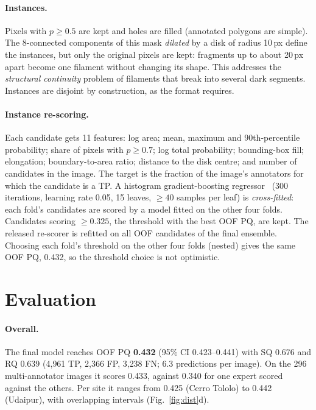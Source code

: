 \documentclass[sigconf]{acmart}
\begin{document}
\paragraph{Instances.} Pixels with $p\ge0.5$ are kept and holes are filled (annotated polygons are simple). The 8-connected
components of this mask \emph{dilated} by a disk of radius 10\,px define the instances, but only the original pixels are
kept: fragments up to about 20\,px apart become one filament without changing its shape. This addresses the
\emph{structural continuity} problem of filaments that break into several dark segments. Instances are disjoint by
construction, as the format requires.

\paragraph{Instance re-scoring.} Each candidate gets 11 features: log area; mean, maximum and 90th-percentile probability;
share of pixels with $p\ge0.7$; log total probability; bounding-box fill; elongation; boundary-to-area ratio; distance to
the disk centre; and number of candidates in the image. The target is the fraction of the image's annotators for which
the candidate is a TP. A histogram gradient-boosting regressor~\cite{pedregosa2011sklearn,ke2017lightgbm} (300 iterations,
learning rate 0.05, 15 leaves, $\ge40$ samples per leaf) is \emph{cross-fitted}: each fold's candidates are scored by a
model fitted on the other four folds. Candidates scoring $\ge0.325$, the threshold with the best OOF PQ, are kept. The
released re-scorer is refitted on all OOF candidates of the final ensemble. Choosing each fold's threshold on the other
four folds (nested) gives the same OOF PQ, 0.432, so the threshold choice is not optimistic.

\section{Evaluation}\label{sec:evaluation}
\paragraph{Overall.} The final model reaches OOF PQ \textbf{0.432} (95\% CI 0.423--0.441) with SQ 0.676 and RQ 0.639
(4{,}961 TP, 2{,}366 FP, 3{,}238 FN; 6.3 predictions per image). On the 296 multi-annotator images it scores 0.433, against
0.340 for one expert scored against the others. Per site it ranges from 0.425 (Cerro Tololo) to 0.442 (Udaipur), with
overlapping intervals (Fig.~\ref{fig:dist}d).
\end{document}

